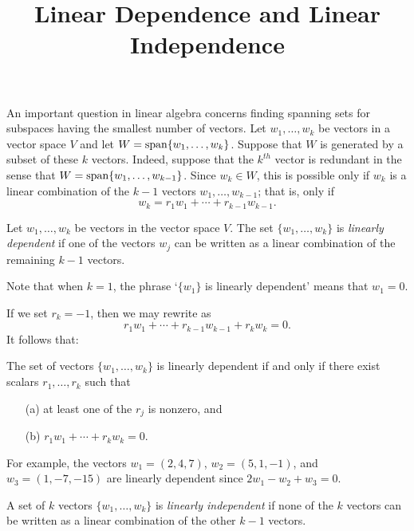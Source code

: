 \documentclass{ximera}
\title{Linear Dependence and Linear Independence}
\begin{document}
\begin{abstract}
\end{abstract}
\maketitle

 \label{S:5.4}

An important question in linear algebra concerns finding spanning
sets for subspaces having the smallest
number of vectors. Let $w_1,\ldots,w_k$ be vectors in a vector
space $V$ and let $W={\rm span}\{w_1,\ldots,w_k\}$.  
Suppose that $W$ is generated by a subset of these $k$ vectors.
Indeed, suppose that the $k^{th}$ vector is redundant in the
sense that $W={\rm span}\{w_1,\ldots,w_{k-1}\}$.  Since $w_k\in W$,
this is possible only if $w_k$ is a linear combination of the
$k-1$ vectors $w_1,\ldots,w_{k-1}$; that is, only if
\begin{equation}  \label{e:depend}
w_k = r_1w_1 + \cdots + r_{k-1}w_{k-1}.
\end{equation}
\begin{Def}  \label{lineardependence}
Let $w_1,\ldots,w_k$ be vectors in the vector space $V$.  The set
$\{w_1,\ldots,w_k\}$ is {\em linearly dependent\/} if one of the vectors
$w_j$ can be written as a linear combination of the remaining $k-1$ vectors.
\end{Def}  
Note that when $k=1$, the phrase `$\{w_1\}$ is linearly dependent'
means that $w_1=0$.

If we set $r_k=-1$, then we may rewrite  as
\[
r_1w_1 + \cdots + r_{k-1}w_{k-1} + r_k w_k =0.
\]
It follows that:
\begin{lemma}  \label{L:lindep}
The set of vectors $\{w_1,\ldots,w_k\}$ is linearly dependent if and
only if there exist scalars $r_1,\ldots,r_k$ such that
\begin{itemize}
\item[(a)]   at least one of the $r_j$ is nonzero, and
\item[(b)]   $r_1w_1 + \cdots + r_k w_k =0.$
\end{itemize}
\end{lemma}

For example, the vectors $w_1=(2,4,7)$, $w_2=(5,1,-1)$, and
$w_3=(1,-7,-15)$ are linearly dependent since $2w_1-w_2+w_3=0$.

\begin{Def}  \label{linearindependence}
A set of $k$ vectors $\{w_1,\ldots,w_k\}$ is {\em linearly
independent\/} if none of the $k$ vectors can be written as a
linear combination of the other $k-1$ vectors.
\end{Def} 
\end{document}
